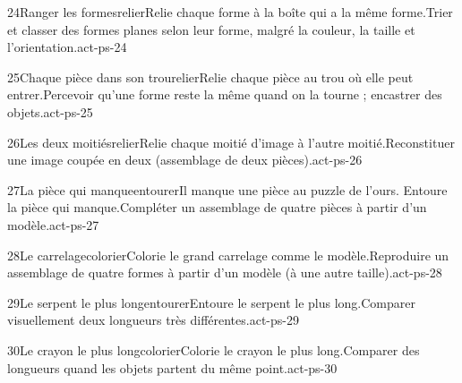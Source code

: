 \begin{activite}{24}{Ranger les formes}{relier}{Relie chaque forme à la boîte qui a la {\otBold\color{otNavy}même forme}.}{Trier et classer des formes planes selon leur forme, malgré la couleur, la taille et l’orientation.}{act-ps-24}
\end{activite}
\begin{activite}{25}{Chaque pièce dans son trou}{relier}{Relie chaque pièce au trou où elle peut entrer.}{Percevoir qu’une forme reste la même quand on la tourne ; encastrer des objets.}{act-ps-25}
\end{activite}
\begin{activite}{26}{Les deux moitiés}{relier}{Relie chaque moitié d’image à l’autre moitié.}{Reconstituer une image coupée en deux (assemblage de deux pièces).}{act-ps-26}
\end{activite}
\begin{activite}{27}{La pièce qui manque}{entourer}{Il manque une pièce au puzzle de l’ours. Entoure la pièce qui manque.}{Compléter un assemblage de quatre pièces à partir d’un modèle.}{act-ps-27}
\end{activite}
\begin{activite}{28}{Le carrelage}{colorier}{Colorie le grand carrelage comme le modèle.}{Reproduire un assemblage de quatre formes à partir d’un modèle (à une autre taille).}{act-ps-28}
\end{activite}
\begin{activite}{29}{Le serpent le plus long}{entourer}{Entoure le serpent le plus {\otBold\color{otNavy}long}.}{Comparer visuellement deux longueurs très différentes.}{act-ps-29}
\end{activite}
\begin{activite}{30}{Le crayon le plus long}{colorier}{Colorie le crayon le plus {\otBold\color{otNavy}long}.}{Comparer des longueurs quand les objets partent du même point.}{act-ps-30}
\end{activite}
